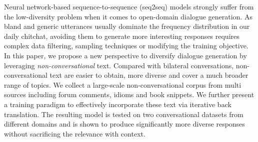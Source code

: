 Neural network-based sequence-to-sequence (seq2seq) models strongly suffer from the low-diversity problem when it comes to open-domain dialogue generation. As bland and generic utterances usually dominate the frequency distribution in our daily chitchat, avoiding them to generate more interesting responses requires complex data filtering, sampling techniques or modifying the training objective. In this paper, we propose a new perspective to diversify dialogue generation by leveraging \emph{non-conversational} text. Compared with bilateral conversations, non-conversational text are easier to obtain, more diverse and cover a much broader range of topics. We collect a large-scale non-conversational corpus from multi sources including forum comments, idioms and book snippets. We further present a training paradigm to effectively incorporate these text via iterative back translation. The resulting model is tested on two conversational datasets from different domains and is shown to produce significantly more diverse responses without sacrificing the relevance with context.
